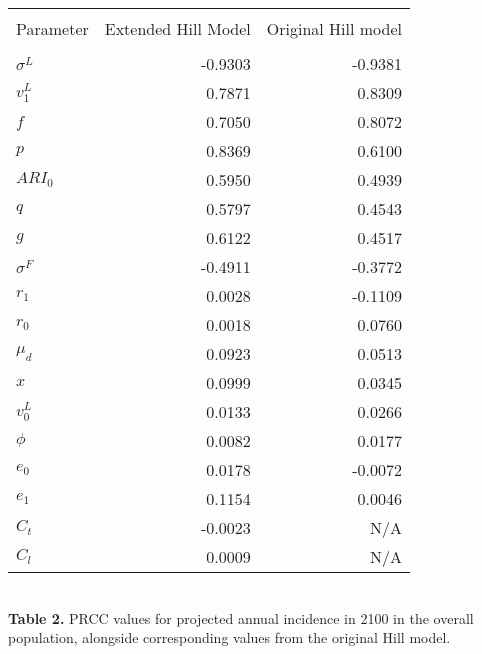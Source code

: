 \documentclass{article}[11pt]
\begin{document}
\begin{table}
\centering
\begin{tabular}{l r r}
\hline\hline\\
Parameter & Extended Hill Model & Original Hill model \\ [0.5ex]
\hline\\
$\sigma^{L}$  & -0.9303 & -0.9381 \\
$v^{L}_{1}$   & 0.7871  & 0.8309 \\
$f$                 & 0.7050  & 0.8072 \\
$p$                & 0.8369  & 0.6100 \\
$ARI_{0}$      & 0.5950  & 0.4939 \\
$q$                & 0.5797  & 0.4543 \\
$g$                & 0.6122  & 0.4517 \\
$\sigma^{F}$ & -0.4911 & -0.3772 \\
$r_{1}$          & 0.0028  & -0.1109 \\
$r_{0}$          & 0.0018  & 0.0760 \\
$\mu_{d}$      & 0.0923 & 0.0513 \\
$x$                 & 0.0999 & 0.0345 \\
$v^{L}_{0}$    & 0.0133 & 0.0266 \\
$\phi$             & 0.0082 & 0.0177 \\
$e_{0}$          & 0.0178 & -0.0072 \\
$e_{1}$          & 0.1154 & 0.0046 \\
$C_{t}$          & -0.0023 & N/A \\
$C_{l}$           & 0.0009 & N/A \\ [1ex]
\hline
\end{tabular}\\[1ex]

{\bf Table 2.} PRCC values for projected annual incidence in 2100
 in the overall population, alongside corresponding values from the
original Hill model.
\end{table}
\end{document}
